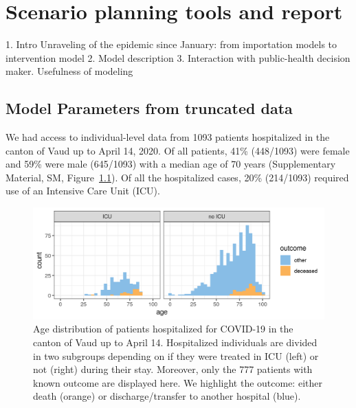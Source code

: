 \chapter{Scenario planning tools and report}
\label{sec:covid-pipeline-reports}


1. Intro Unraveling of the epidemic since January: from importation models to intervention model
2. Model description
3. Interaction with public-health decision maker. Usefulness of modeling

\section{Model Parameters from truncated data}

We had access to individual-level data from 1093 patients hospitalized in the canton of Vaud up to April 14, 2020. Of all patients, 41\% (448/1093) were female and 59\% were male (645/1093) with a median age of 70 years (Supplementary Material, SM, Figure~\ref{fig:vdage}). Of all the hospitalized cases, 20\% (214/1093) required use of an Intensive Care Unit (ICU).

\begin{figure}[!htb]
    \centering
    \includegraphics[width = .7\textwidth]{fig_covid-switzerland-npi/fig_supp/VD_hist_age.png}
    \caption[Age distribution of patients hospitalized for COVID-19 in the canton of Vaud]{Age distribution of patients hospitalized for COVID-19 in the canton of Vaud up to April 14. Hospitalized individuals are divided in two subgroups depending on if they were treated in ICU (left) or not (right) during their stay. Moreover, only the 777 patients with known outcome are displayed here. We highlight the outcome:  either death (orange) or discharge/transfer to another hospital (blue).}
    \label{fig:vdage}
\end{figure}

